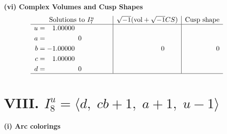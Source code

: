 \documentclass[1p]{elsarticle_modified}
\theoremstyle{definition}
\newcommand{\I}{\sqrt{-1}}
\begin{document}
\newpage\flushleft \textbf{(vi) Complex Volumes and Cusp Shapes}
$$\begin{array}{c|c|c}  
\text{Solutions to }I^u_{7}& \I (\text{vol} + \sqrt{-1}CS) & \text{Cusp shape}\\
 \hline 
\begin{aligned}
u &= \phantom{-}1.00000\phantom{ +0.000000I} \\
a &= \phantom{-0.000000 } 0 \\
b &= -1.00000\phantom{ +0.000000I} \\
c &= \phantom{-}1.00000\phantom{ +0.000000I} \\
d &= \phantom{-0.000000 } 0\end{aligned}
 & \phantom{-0.000000 } 0 & \phantom{-0.000000 } 0\\
 \hline 
 \end{array}$$\newpage\newpage\renewcommand{\arraystretch}{1}
\centering \section*{VIII. $I^u_{8}= \langle d,\;c b+1,\;a+1,\;u-1 \rangle$}
\flushleft \textbf{(i) Arc colorings}\\
\end{document}
